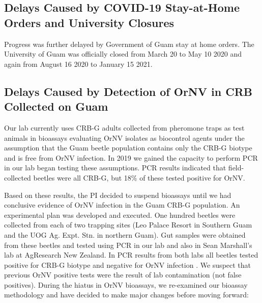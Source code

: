 \documentclass[12pt,letterpaper,english,bibliography=totocnumbered,abstract=on]{scrartcl}
\begin{document}
\subsection{Delays Caused by COVID-19 Stay-at-Home Orders and University Closures}
\label{stayathome}
Progress was further delayed by Government of Guam stay at home orders. The University
of Guam was officially closed from March 20 to May 10 2020 and again from August 16 2020
to January 15 2021.

\subsection{Delays Caused by Detection of OrNV in CRB Collected on Guam}

Our lab currently uses CRB-G adults collected from pheromone traps as test animals
in bioassays evaluating OrNV isolates as biocontrol agents under the assumption that the
Guam beetle population contains only the CRB-G biotype and is free from OrNV infection.
In 2019 we gained the capacity to perform PCR in our lab began testing these assumptions.
PCR results indicated that field-collected beetles were all CRB-G, but 18\% of these tested
positive for OrNV.

Based on these results, the PI decided to suspend bioassays until we had conclusive evidence of OrNV infection in the Guam CRB-G population. An experimental plan \cite{mooreExperimentalPlanDetermining2020} was
developed and executed. One hundred beetles were collected from each of two trapping sites
(Leo Palace Resort in Southern Guam and the UOG Ag. Expt. Stn. in northern Guam).
Gut samples were obtained from these beetles and tested using PCR in our lab and also in
Sean Marshall's lab at AgResearch New Zealand. In PCR results from both labs all beetles tested positive for CRB-G biotype and negative for OrNV infection \cite{graselaInvestigationDeterminePresence2020}. We suspect that
previous OrNV positive tests were the result of lab contamination (not false positives).
During the hiatus in OrNV bioassays, we re-examined our bioassay methodology and have
decided to make major changes before moving forward:
\end{document}
